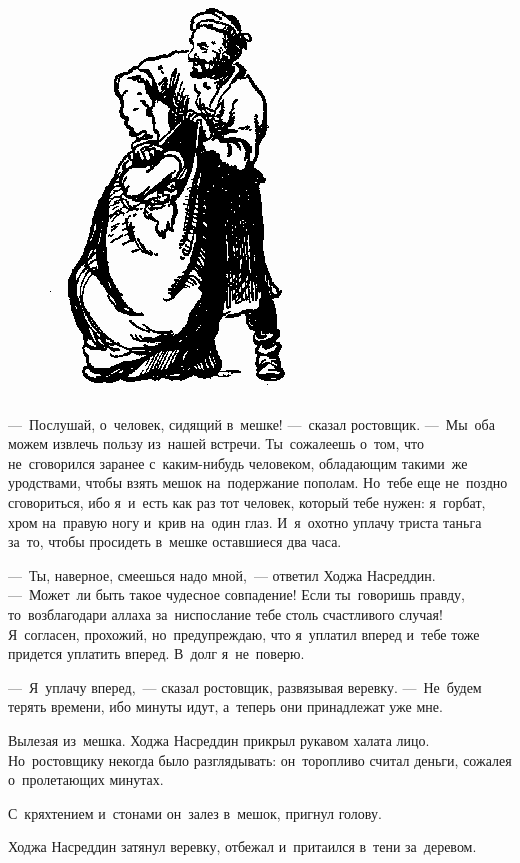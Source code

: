 \documentclass[12pt,a4paper]{book}
\begin{document}
\begin{figure}[t]
\centering
\includegraphics[scale=0.75]{20.png}
\end{figure}

—~Послушай, о~человек, сидящий в~мешке! —~сказал ростовщик. —~Мы~оба можем извлечь пользу из~нашей встречи. Ты~сожалеешь о~том, что не~сговорился заранее с~каким-нибудь человеком, обладающим такими~же уродствами, чтобы взять мешок на~подержание пополам. Но~тебе еще не~поздно сговориться, ибо я~и~есть как раз тот человек, который тебе нужен: я~горбат, хром на~правую ногу и~крив на~один глаз. И~я~охотно уплачу триста таньга за~то, чтобы просидеть в~мешке оставшиеся два часа.

—~Ты, наверное, смеешься надо мной,~— ответил Ходжа Насреддин. —~Может~ли быть такое чудесное совпадение! Если ты~говоришь правду, то~возблагодари аллаха за~ниспослание тебе столь счастливого случая! Я~согласен, прохожий, но~предупреждаю, что я~уплатил вперед и~тебе тоже придется уплатить вперед. В~долг я~не~поверю.

—~Я~уплачу вперед,~— сказал ростовщик, развязывая веревку. —~Не~будем терять времени, ибо минуты идут, а~теперь они принадлежат уже мне.

Вылезая из~мешка. Ходжа Насреддин прикрыл рукавом халата лицо. Но~ростовщику некогда было разглядывать: он~торопливо считал деньги, сожалея о~пролетающих минутах.

С~кряхтением и~стонами он~залез в~мешок, пригнул голову.

Ходжа Насреддин затянул веревку, отбежал и~притаился в~тени за~деревом.
\end{document}
